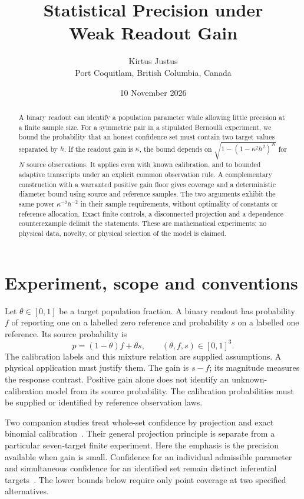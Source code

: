 \documentclass[11pt,a4paper]{article}
\title{Statistical Precision under\\Weak Readout Gain}
\author{Kirtus Justus\\\small Port Coquitlam, British Columbia, Canada}
\date{10 November 2026}
\begin{document}
\maketitle
\begin{abstract}
A binary readout can identify a population parameter while allowing little precision at a finite sample size. For a symmetric pair in a stipulated Bernoulli experiment, we bound the probability that an honest confidence set must contain two target values separated by $h$. If the readout gain is $\kappa$, the bound depends on $\sqrt{1-(1-\kappa^2h^2)^N}$ for $N$ source observations. It applies even with known calibration, and to bounded adaptive transcripts under an explicit common observation rule. A complementary construction with a warranted positive gain floor gives coverage and a deterministic diameter bound using source and reference samples. The two arguments exhibit the same power $\kappa^{-2}h^{-2}$ in their sample requirements, without optimality of constants or reference allocation. Exact finite controls, a disconnected projection and a dependence counterexample delimit the statements. These are mathematical experiments; no physical data, novelty, or physical selection of the model is claimed.
\end{abstract}

\section{Experiment, scope and conventions}

Let $\theta\in[0,1]$ be a target population fraction. A binary readout has probability $f$ of reporting one on a labelled zero reference and probability $s$ on a labelled one reference. Its source probability is
\begin{equation}
 p=(1-\theta)f+\theta s,\qquad (\theta,f,s)\in[0,1]^3.
 \label{eq:readout}
\end{equation}
The calibration labels and this mixture relation are supplied assumptions. A physical application must justify them. The gain is $s-f$; its magnitude measures the response contrast. Positive gain alone does not identify an unknown-calibration model from its source probability. The calibration probabilities must be supplied or identified by reference observation laws.

Two companion studies treat whole-set confidence by projection and exact binomial calibration~\cite{justusCalibration,justusJoint}. Their general projection principle is separate from a particular seven-target finite experiment. Here the emphasis is the precision available when gain is small. Confidence for an individual admissible parameter and simultaneous confidence for an identified set remain distinct inferential targets~\cite{romano}. The lower bounds below require only point coverage at two specified alternatives.
\end{document}
